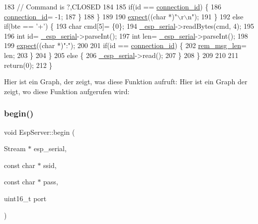 \begin{DoxyCode}
183         \textcolor{comment}{// Command is ?,CLOSED}
184 
185         \textcolor{keywordflow}{if}(\textcolor{keywordtype}{id} == \hyperlink{class_esp_server_ab601ba8cdf21497e04e862f22e52c590}{connection\_id}) \{
186           \hyperlink{class_esp_server_ab601ba8cdf21497e04e862f22e52c590}{connection\_id}= -1;
187         \}
188       \}
189 
190       \hyperlink{class_esp_server_a2008f0d315cff00a4bcc1120eeb2dc95}{expect}((\textcolor{keywordtype}{char} *)\textcolor{stringliteral}{"\(\backslash\)r\(\backslash\)n"});
191     \}
192     \textcolor{keywordflow}{else} \textcolor{keywordflow}{if}(bte == \textcolor{charliteral}{'+'}) \{
193       \textcolor{keywordtype}{char} cmd[5]= \{0\};
194       \hyperlink{class_esp_server_a33166aa92db341d47cdf1776492cca62}{\_esp\_serial}->readBytes(cmd, 4);
195 
196       \textcolor{keywordtype}{int} \textcolor{keywordtype}{id}= \hyperlink{class_esp_server_a33166aa92db341d47cdf1776492cca62}{\_esp\_serial}->parseInt();
197       \textcolor{keywordtype}{int} len= \hyperlink{class_esp_server_a33166aa92db341d47cdf1776492cca62}{\_esp\_serial}->parseInt();
198 
199       \hyperlink{class_esp_server_a2008f0d315cff00a4bcc1120eeb2dc95}{expect}((\textcolor{keywordtype}{char} *)\textcolor{stringliteral}{":"});
200 
201       \textcolor{keywordflow}{if}(\textcolor{keywordtype}{id} == \hyperlink{class_esp_server_ab601ba8cdf21497e04e862f22e52c590}{connection\_id}) \{
202         \hyperlink{class_esp_server_a0cff51089b75a6edf347b86727683e7f}{rem\_msg\_len}= len;
203       \}
204     \}
205     \textcolor{keywordflow}{else} \{
206       \hyperlink{class_esp_server_a33166aa92db341d47cdf1776492cca62}{\_esp\_serial}->read();
207     \}
208   \}
209 
210 
211   \textcolor{keywordflow}{return}(0);
212 \}
\end{DoxyCode}
Hier ist ein Graph, der zeigt, was diese Funktion aufruft\+:
Hier ist ein Graph der zeigt, wo diese Funktion aufgerufen wird\+:
\mbox{\label{class_esp_server_a1d032e732d4733905d676ef016fcd43c}} 
\subsubsection{\texorpdfstring{begin()}{begin()}}
{\footnotesize\ttfamily void Esp\+Server\+::begin (\begin{DoxyParamCaption}\item[{Stream $\ast$}]{esp\+\_\+serial,  }\item[{const char $\ast$}]{ssid,  }\item[{const char $\ast$}]{pass,  }\item[{uint16\+\_\+t}]{port }\end{DoxyParamCaption})}




